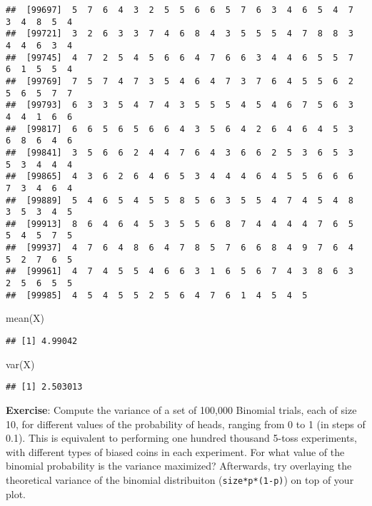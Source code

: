 \documentclass[
]{book}
\newenvironment{Shaded}{\begin{snugshade}}{\end{snugshade}}
\newcommand{\FunctionTok}[1]{\textcolor[rgb]{0.00,0.00,0.00}{#1}}
\newcommand{\NormalTok}[1]{#1}
\begin{document}
\begin{verbatim}
##  [99697]  5  7  6  4  3  2  5  5  6  6  5  7  6  3  4  6  5  4  7  3  4  8  5  4
##  [99721]  3  2  6  3  3  7  4  6  8  4  3  5  5  5  4  7  8  8  3  4  4  6  3  4
##  [99745]  4  7  2  5  4  5  6  6  4  7  6  6  3  4  4  6  5  5  7  6  1  5  5  4
##  [99769]  7  5  7  4  7  3  5  4  6  4  7  3  7  6  4  5  5  6  2  5  6  5  7  7
##  [99793]  6  3  3  5  4  7  4  3  5  5  5  4  5  4  6  7  5  6  3  4  4  1  6  6
##  [99817]  6  6  5  6  5  6  6  4  3  5  6  4  2  6  4  6  4  5  3  6  8  6  4  6
##  [99841]  3  5  6  6  2  4  4  7  6  4  3  6  6  2  5  3  6  5  3  5  3  4  4  4
##  [99865]  4  3  6  2  6  4  6  5  3  4  4  4  6  4  5  5  6  6  6  7  3  4  6  4
##  [99889]  5  4  6  5  4  5  5  8  5  6  3  5  5  4  7  4  5  4  8  3  5  3  4  5
##  [99913]  8  6  4  6  4  5  3  5  5  6  8  7  4  4  4  4  7  6  5  5  4  5  7  5
##  [99937]  4  7  6  4  8  6  4  7  8  5  7  6  6  8  4  9  7  6  4  5  2  7  6  5
##  [99961]  4  7  4  5  5  4  6  6  3  1  6  5  6  7  4  3  8  6  3  2  5  6  5  5
##  [99985]  4  5  4  5  5  2  5  6  4  7  6  1  4  5  4  5
\end{verbatim}

\begin{Shaded}
\begin{Highlighting}[]
\FunctionTok{mean}\NormalTok{(X)}
\end{Highlighting}
\end{Shaded}

\begin{verbatim}
## [1] 4.99042
\end{verbatim}

\begin{Shaded}
\begin{Highlighting}[]
\FunctionTok{var}\NormalTok{(X)}
\end{Highlighting}
\end{Shaded}

\begin{verbatim}
## [1] 2.503013
\end{verbatim}

\textbf{Exercise}: Compute the variance of a set of 100,000 Binomial trials, each of size 10, for different values of the probability of heads, ranging from 0 to 1 (in steps of 0.1). This is equivalent to performing one hundred thousand 5-toss experiments, with different types of biased coins in each experiment. For what value of the binomial probability is the variance maximized? Afterwards, try overlaying the theoretical variance of the binomial distribuiton (\texttt{size*p*(1-p)}) on top of your plot.
\end{document}
